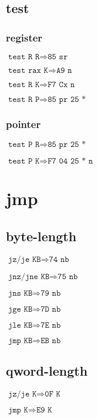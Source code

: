 \documentclass{article}
\begin{document}
\subsection{test}
\begin{minipage}{\textwidth}

\subsubsection{register}

$\texttt{test R R} \Rightarrow \texttt{85 sr}$

$\texttt{test rax K} \Rightarrow \texttt{A9 n}$

$\texttt{test R K} \Rightarrow \texttt{F7 Cx n}$

$\texttt{test R P} \Rightarrow \texttt{85 pr 25 *}$

\subsubsection{pointer}

$\texttt{test P R} \Rightarrow \texttt{85 pr 25 *}$

$\texttt{test P K} \Rightarrow \texttt{F7 04 25 * n}$

\end{minipage}


\section{jmp}

\subsection{byte-length}
\begin{minipage}{\textwidth}

$\texttt{jz/je KB} \Rightarrow \texttt{74 nb}$

$\texttt{jnz/jne KB} \Rightarrow \texttt{75 nb}$

$\texttt{jns KB} \Rightarrow \texttt{79 nb}$

$\texttt{jge KB} \Rightarrow \texttt{7D nb}$

$\texttt{jle KB} \Rightarrow \texttt{7E nb}$

$\texttt{jmp KB} \Rightarrow \texttt{EB nb}$

\end{minipage}

\subsection{qword-length}
\begin{minipage}{\textwidth}

$\texttt{jz/je K} \Rightarrow \texttt{0F K}$

$\texttt{jmp K} \Rightarrow \texttt{E9 K}$

\end{minipage}
\end{document}
